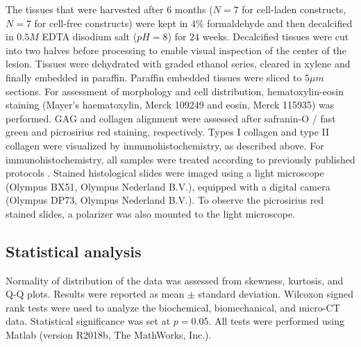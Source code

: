 \documentclass[twocolumn, empirical, authordate, issue]{jote-new-article}
\begin{document}
The tissues that were harvested after $6$ months ($N=7$ for cell-laden constructs, $N=7$ for cell-free constructs) were kept in $4\%$ formaldehyde and then decalcified in $0.5M$ EDTA disodium salt ($pH = 8$) for $24$ weeks. Decalcified tissues were cut into two halves before processing to enable visual inspection of the center of the lesion. Tissues were dehydrated with graded ethanol series, cleared in xylene and finally embedded in paraffin. Paraffin embedded tissues were sliced to $5 \mu m$ sections. For assessment of morphology and cell distribution, hematoxylin-eosin staining (Mayer's haematoxylin, Merck 109249 and eosin, Merck 115935) was performed. GAG and collagen alignment were assessed after safranin-O / fast green and picrosirius red staining, respectively. Types I collagen and type II collagen were visualized by immunohistochemistry, as described above. For immunohistochemistry, all samples were treated according to previously published protocols \parencite{Levato2017}. Stained histological slides were imaged using a light microscope (Olympus BX51, Olympus Nederland B.V.), equipped with a digital camera (Olympus DP73, Olympus Nederland B.V.). To observe the picrosirius red stained slides, a polarizer was also mounted to the light microscope.

\subsection{Statistical analysis} 

Normality of distribution of the data was assessed from skewness, kurtosis, and Q-Q plots. Results were reported as mean $\pm$ standard deviation. Wilcoxon signed rank tests were used to analyze the biochemical, biomechanical, and micro-CT data. Statistical significance was set at $p = 0.05$. All tests were performed using Matlab (version R2018b, The MathWorks, Inc.).
\end{document}

